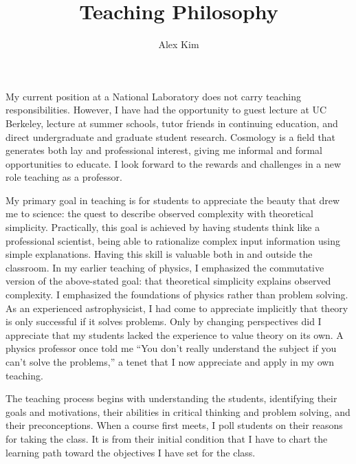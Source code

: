 \documentclass[12pt]{article}
\date{}
\begin{document}
\title{Teaching Philosophy}
\author{Alex Kim}
\maketitle

My current position at a National Laboratory does not carry teaching responsibilities.  However,
I have had the opportunity to guest lecture at UC Berkeley, lecture at summer schools, tutor friends
in continuing education, and direct undergraduate and graduate student research.  Cosmology
is a field that generates both lay and professional interest, giving me informal and formal opportunities to
educate.  I look forward to the rewards and challenges in a new role teaching as a professor. 

My primary goal in teaching is for students to appreciate the beauty that drew me to science: the quest to
describe  observed complexity with
theoretical simplicity.  Practically, this goal is achieved by having students think like a professional scientist, being able to 
rationalize complex input information using simple explanations.  Having this skill is valuable both in and
outside the classroom.
In my earlier teaching of physics,  I emphasized the commutative version
of the above-stated goal: that theoretical simplicity explains observed complexity.  I  emphasized the foundations of physics
rather than problem solving. As an experienced astrophysicist, I had come to
appreciate implicitly that theory is only successful if it solves problems.  Only by changing perspectives
did I appreciate that my students lacked the experience
to value theory on its own.  A  physics professor once told me
``You don't really understand the subject if you can't solve the problems,'' a tenet that I now  appreciate and
apply in my own teaching.


The teaching process  begins with understanding the students, identifying their goals and motivations, their abilities in critical thinking and
problem solving, and their preconceptions.  When a course first meets, I poll students on their reasons for taking the
class.  It is from their initial condition that I have to chart the learning path toward the objectives I have set for the class. 
\end{document}
